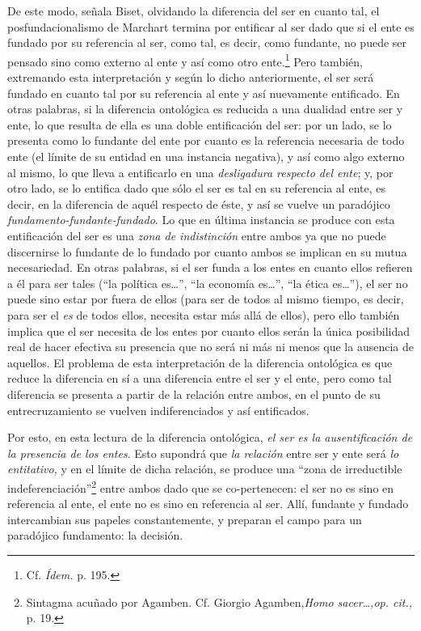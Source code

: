 De este modo, señala Biset, olvidando la diferencia del ser en cuanto tal, el posfundacionalismo de Marchart termina por entificar al ser dado que si el ente es fundado por su referencia al ser, como tal, es decir, como fundante, no puede ser pensado sino como externo al ente y así como otro ente.\footnote{Cf. \emph{Ídem.} p. 195.} Pero también, extremando esta interpretación y según lo dicho anteriormente, el ser será fundado en cuanto tal por su referencia al ente y así nuevamente entificado. En otras palabras, si la diferencia ontológica es reducida a una dualidad entre ser y ente, lo que resulta de ella es una doble entificación del ser: por un lado, se lo presenta como lo fundante del ente por cuanto es la referencia necesaria de todo ente (el límite de su entidad en una instancia negativa), y así como algo externo al mismo, lo que lleva a entificarlo en una \emph{desligadura respecto del ente}; y, por otro lado, se lo entifica dado que sólo el ser es tal en su referencia al ente, es decir, en la diferencia de aquél respecto de éste, y así se vuelve un paradójico \emph{fundamento-fundante-fundado}. Lo que en última instancia se produce con esta entificación del ser es una \emph{zona de indistinción} entre ambos ya que no puede discernirse lo fundante de lo fundado por cuanto ambos se implican en su mutua necesariedad. En otras palabras, si el ser funda a los entes en cuanto ellos refieren a él para ser tales (\enquote{la política es\ldots}, \enquote{la economía es\ldots}, \enquote{la ética es\ldots}), el ser no puede sino estar por fuera de ellos (para ser de todos al mismo tiempo, es decir, para ser el \emph{es} de todos ellos, necesita estar más allá de ellos), pero ello también implica que el ser necesita de los entes por cuanto ellos serán la única posibilidad real de hacer efectiva su presencia que no será ni más ni menos que la ausencia de aquellos. El problema de esta interpretación de la diferencia ontológica es que reduce la diferencia en sí a una diferencia entre el ser y el ente, pero como tal diferencia se presenta a partir de la relación entre ambos, en el punto de su entrecruzamiento se vuelven indiferenciados y así entificados.

Por esto, en esta lectura de la diferencia ontológica, \emph{el ser es la ausentificación de la presencia de los entes}. Esto supondrá que \emph{la relación} entre ser y ente será \emph{lo entitativo,} y en el límite de dicha relación, se produce una \enquote{zona de irreductible indeferenciación}\footnote{Sintagma acuñado por Agamben. Cf. Giorgio Agamben,\emph{Homo sacer\ldots,op. cit.,} p. 19.} entre ambos dado que se co-pertenecen: el ser no es sino en referencia al ente, el ente no es sino en referencia al ser. Allí, fundante y fundado intercambian sus papeles constantemente, y preparan el campo para un paradójico fundamento: la decisión.

